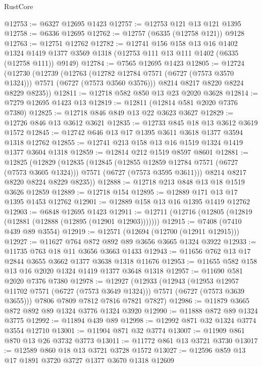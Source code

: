 \begin{lexlean}{RustCore}
\begin{coremodule}
@12753 := @6327 @12695 @1423
@12757 := @12753 @121 @13 @121 @1395
@12758 := @6336 @12695
@12762 := @12757 (@6335 (@12758 @121)) @9128
@12763 := @12751 @12762
@12782 := @12741
    @156
    @158
    @13
    @16
    @1402
    @1324
    @1419
    @1377
    @3569
    @1318
    (@12753 @111 @13 @111 @1402 (@6335 (@12758 @111)) @9149)
@12784 := @7565 @12695 @1423
@12805 := @12724
    (@12730
      (@12739
        (@12763 (@12782 @12784 @7571 (@6727 (@7573 @3570 @1324))) @7571 (@6727 (@7573 @3560 @3576)))
        @8214
        @8217
        @8220
        @8224
        @8229
        @8235))
@12811 := @12718 @582 @850 @13 @23 @2020 @3628
@12814 := @7279 @12695 @1423 @13
@12819 := @12811 (@12814 @581 @2020 @7376 @7380)
@12825 := @12718 @846 @849 @13 @22 @3623 @3627
@12829 := @12726 @846 @13 @3612 @3621
@12835 := @12733 @845 @18 @13 @3612 @3619 @1572
@12845 := @12742 @646 @13 @17 @1395 @3611 @3618 @1377 @3594 @1318 @12762
@12855 := @12741 @213 @158 @13 @16 @1519 @1324 @1419 @1377 @3604 @1318
@12859 := @12814 @212 @1519 @8597 @8601
@12881 := @12825
    (@12829
      (@12835
        (@12845
          (@12855 @12859 @12784 @7571 (@6727 (@7573 @3605 @1324)))
          @7571
          (@6727 (@7573 @3595 @3611)))
        @8214
        @8217
        @8220
        @8224
        @8229
        @8235))
@12888 := @12718 @213 @848 @13 @18 @1519 @3626 @12859
@12889 := @12718 @154
@12895 := @12889 @171 @13 @17 @1395 @1453 @12762
@12901 := @12889 @158 @13 @16 @1395 @1419 @12762
@12903 := @6848 @12695 @1423
@12911 := @12711 (@12716 (@12805 (@12819 (@12881 (@12888 (@12895 (@12901 @12903)))))))
@12915 := @7408 (@7410 @439 @89 @3554)
@12919 := @12571 (@12694 (@12700 (@12911 @12915)))
@12927 := @11627 @764 @872 @892 @89 @3656 @3665 @1324 @3922
@12933 := @11735 @763 @18 @11 @3656 @3663 @1433
@12943 := @11656 @762 @13 @17 @2844 @3655 @3662 @1377 @3638 @1318 @11676
@12953 := @11655 @582 @158 @13 @16 @2020 @1324 @1419 @1377 @3648 @1318
@12957 := @11690 @581 @2020 @7376 @7380
@12978 := @12927
    (@12933
      (@12943
        (@12953 @12957 @11702 @7571 (@6727 (@7573 @3649 @1324)))
        @7571
        (@6727 (@7573 @3639 @3655)))
      @7806
      @7809
      @7812
      @7816
      @7821
      @7827)
@12986 := @11879 @3665 @872 @892 @89 @1324 @3776 @1324 @3920
@12990 := @11888 @872 @89 @1324 @3775
@12992 := @11894 @439 @89
@12998 := @12992 @871 @32 @1324 @3774 @3554 @12710
@13001 := @11904 @871 @32 @3774
@13007 := @11909 @861 @870 @13 @26 @3732 @3773
@13011 := @11772 @861 @13 @3721 @3730
@13017 := @12589 @860 @18 @13 @3721 @3728 @1572
@13027 := @12596 @859 @13 @17 @1891 @3720 @3727 @1377 @3670 @1318 @12609

\end{coremodule}
\end{lexlean}
